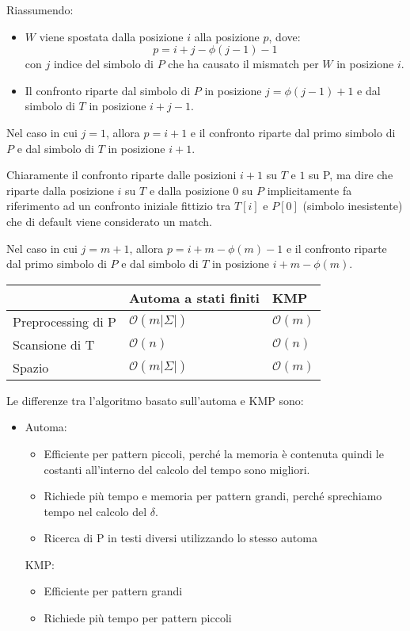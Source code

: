 Riassumendo:
\begin{itemize}
    \item $W$ viene spostata dalla posizione $i$ alla posizione $p$, dove:
          $$p = i + j - \phi(j - 1) - 1$$ con $j$ indice del simbolo di $P$ che ha
          causato il mismatch per $W$ in posizione $i$.
    \item Il confronto riparte dal simbolo di $P$ in posizione $j = \phi(j - 1) + 1$
          e dal simbolo di $T$ in posizione $i + j - 1$.
\end{itemize}
Nel caso in cui $j = 1$, allora $p = i + 1$ e il confronto riparte dal primo
simbolo di $P$ e dal simbolo di $T$ in posizione $i + 1$.
\begin{nota}
    Chiaramente il confronto riparte dalle posizioni $i + 1$ su $T$ e $1$ su P,
    ma dire che riparte dalla posizione $i$ su $T$ e dalla posizione $0$ su $P$
    implicitamente fa riferimento ad un confronto iniziale fittizio tra $T[i]$ e
    $P[0]$ (simbolo inesistente) che di default viene considerato un match.
\end{nota}
Nel caso in cui $j = m + 1$, allora $p = i + m - \phi(m) - 1$ e il confronto
riparte dal primo simbolo di $P$ e dal simbolo di $T$ in posizione $i + m - \phi(m)$.
\begin{table}[!ht]
    \centering
    \begin{tabular}{|l|l|l|}
        \hline
                           & Automa a stati finiti       & KMP              \\ \hline
        Preprocessing di P & $\mathcal{O}(m | \Sigma |)$ & $\mathcal{O}(m)$ \\ \hline
        Scansione di T     & $\mathcal{O}(n)$            & $\mathcal{O}(n)$ \\ \hline
        Spazio             & $\mathcal{O}(m | \Sigma |)$ & $\mathcal{O}(m)$ \\ \hline
    \end{tabular}
\end{table}
Le differenze tra l'algoritmo basato sull'automa e KMP sono:
\begin{itemize}
    \item Automa:
          \begin{itemize}
              \item Efficiente per pattern piccoli, perché la memoria è contenuta
                    quindi le costanti all'interno del calcolo del tempo sono migliori.
              \item Richiede più tempo e memoria per pattern grandi, perché sprechiamo
                    tempo nel calcolo del $\delta$.
              \item Ricerca di P in testi diversi utilizzando lo stesso automa
          \end{itemize}
          KMP:
          \begin{itemize}
              \item Efficiente per pattern grandi
              \item Richiede più tempo per pattern piccoli
          \end{itemize}
\end{itemize}

